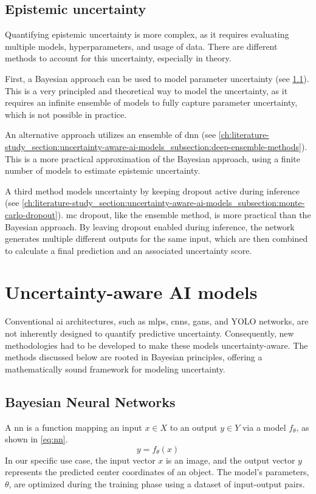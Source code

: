 \subsection{Epistemic uncertainty} \label{ch:literature-study_section:quantifying-uncertainty_subsection:epistemic-uncertainty}
Quantifying epistemic uncertainty is more complex, as it requires evaluating multiple models, hyperparameters, and usage of data.
There are different methods to account for this uncertainty, especially in theory.

First, a Bayesian approach can be used to model parameter uncertainty (see \cref{ch:literature-study_section:uncertainty-aware-ai-models_subsection:bayesian-neural-networks}).
This is a very principled and theoretical way to model the uncertainty, as it requires an infinite ensemble of models to fully capture parameter uncertainty, which is not possible in practice.

An alternative approach utilizes an ensemble of \gls{dnn} (see \cref{ch:literature-study_section:uncertainty-aware-ai-models_subsection:deep-ensemble-methods}).
This is a more practical approximation of the Bayesian approach, using a finite number of models to estimate epistemic uncertainty.

A third method models uncertainty by keeping dropout active during inference (see \cref{ch:literature-study_section:uncertainty-aware-ai-models_subsection:monte-carlo-dropout}).
\gls{mc} dropout, like the ensemble method, is more practical than the Bayesian approach. 
By leaving dropout enabled during inference, the network generates multiple different outputs for the same input, which are then combined to calculate a final prediction and an associated uncertainty score.

\section{Uncertainty-aware AI models} \label{ch:literature-study_section:uncertainty-aware-ai-models}
Conventional \gls{ai} architectures, such as \glspl{mlp}, \glspl{cnn}, \glspl{gan}, and YOLO networks, are not inherently designed to quantify predictive uncertainty.
Consequently, new methodologies had to be developed to make these models uncertainty-aware.
The methods discussed below are rooted in Bayesian principles, offering a mathematically sound framework for modeling uncertainty.

\subsection{Bayesian Neural Networks} \label{ch:literature-study_section:uncertainty-aware-ai-models_subsection:bayesian-neural-networks}
A \gls{nn} is a function mapping an input $x \in X$ to an output $y \in Y$ via a model $f_{\theta}$, as shown in \cref{eq:nn}.
\begin{equation}
    y = f_{\theta}(x)
    \label{eq:nn}
\end{equation}
In our specific use case, the input vector $x$ is an image, and the output vector $y$ represents the predicted center coordinates of an object.
The model's parameters, $\theta$, are optimized during the training phase using a dataset of input-output pairs.

